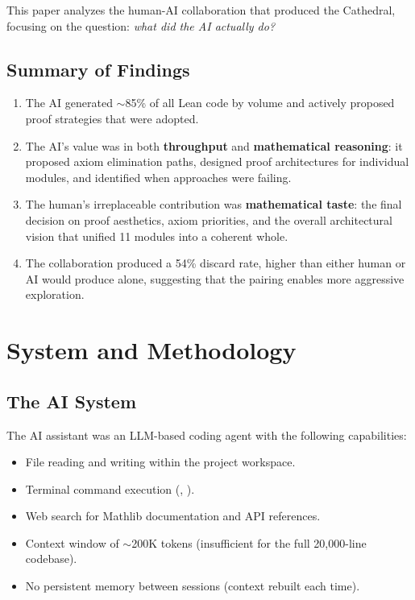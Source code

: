 \documentclass[11pt,a4paper]{article}
\begin{document}
This paper analyzes the human-AI collaboration that produced the
Cathedral, focusing on the question: \emph{what did the AI actually
do?}

\subsection{Summary of Findings}

\begin{enumerate}
  \item The AI generated $\sim$85\% of all Lean code by volume and
    actively proposed proof strategies that were adopted.
  \item The AI's value was in both \textbf{throughput} and
    \textbf{mathematical reasoning}: it proposed axiom elimination
    paths, designed proof architectures for individual modules, and
    identified when approaches were failing.
  \item The human's irreplaceable contribution was
    \textbf{mathematical taste}: the final decision on proof
    aesthetics, axiom priorities, and the overall architectural
    vision that unified 11 modules into a coherent whole.
  \item The collaboration produced a 54\% discard rate, higher than
    either human or AI would produce alone, suggesting that the
    pairing enables more aggressive exploration.
\end{enumerate}

\section{System and Methodology}
\label{sec:system}

\subsection{The AI System}

The AI assistant was an LLM-based coding agent with the following
capabilities:

\begin{itemize}
  \item File reading and writing within the project workspace.
  \item Terminal command execution (, ).
  \item Web search for Mathlib documentation and API references.
  \item Context window of $\sim$200K tokens (insufficient for the
    full 20,000-line codebase).
  \item No persistent memory between sessions (context rebuilt each
    time).
\end{itemize}
\end{document}
